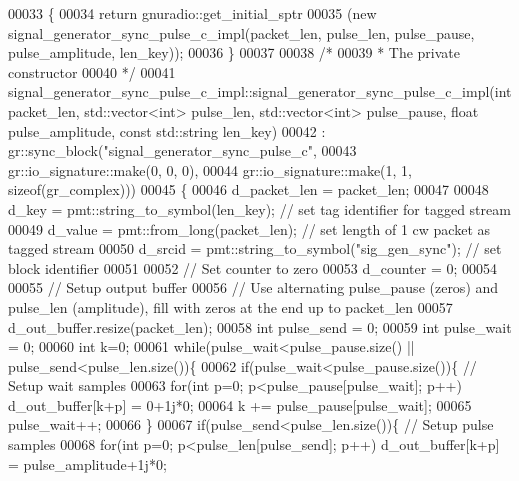 \begin{DoxyCode}
00033     \{
00034       \textcolor{keywordflow}{return} gnuradio::get\_initial\_sptr
00035         (\textcolor{keyword}{new} signal_generator_sync_pulse_c_impl(packet\_len, pulse\_len, pulse\_pause, pulse\_amplitude, 
      len\_key));
00036     \}
00037 
00038     \textcolor{comment}{/*}
00039 \textcolor{comment}{     * The private constructor}
00040 \textcolor{comment}{     */}
00041     signal_generator_sync_pulse_c_impl::signal_generator_sync_pulse_c_impl(\textcolor{keywordtype}{int} packet\_len, std::vector<int>
       pulse\_len, std::vector<int> pulse\_pause, \textcolor{keywordtype}{float} pulse\_amplitude, \textcolor{keyword}{const} 
      std::string len\_key)
00042       : gr::sync\_block(\textcolor{stringliteral}{"signal\_generator\_sync\_pulse\_c"},
00043               gr::io\_signature::make(0, 0, 0),
00044               gr::io\_signature::make(1, 1, sizeof(gr\_complex)))
00045     \{
00046         d_packet_len = packet\_len;
00047         
00048         d_key = pmt::string\_to\_symbol(len\_key); \textcolor{comment}{// set tag identifier for tagged stream}
00049         d_value = pmt::from\_long(packet\_len); \textcolor{comment}{// set length of 1 cw packet as tagged stream}
00050         d_srcid = pmt::string\_to\_symbol(\textcolor{stringliteral}{"sig\_gen\_sync"}); \textcolor{comment}{// set block identifier}
00051         
00052         \textcolor{comment}{// Set counter to zero}
00053         d_counter = 0;
00054         
00055         \textcolor{comment}{// Setup output buffer}
00056         \textcolor{comment}{// Use alternating pulse\_pause (zeros) and pulse\_len (amplitude), fill with zeros at the end up to
       packet\_len}
00057         d_out_buffer.resize(packet\_len);
00058         \textcolor{keywordtype}{int} pulse\_send = 0;
00059         \textcolor{keywordtype}{int} pulse\_wait = 0;
00060         \textcolor{keywordtype}{int} k=0;
00061         \textcolor{keywordflow}{while}(pulse\_wait<pulse\_pause.size() || pulse\_send<pulse\_len.size())\{
00062             \textcolor{keywordflow}{if}(pulse\_wait<pulse\_pause.size())\{ \textcolor{comment}{// Setup wait samples}
00063                 \textcolor{keywordflow}{for}(\textcolor{keywordtype}{int} p=0; p<pulse\_pause[pulse\_wait]; p++) d_out_buffer[k+p] = 0+1j*0;
00064                 k += pulse\_pause[pulse\_wait];
00065                 pulse\_wait++;
00066             \}
00067             \textcolor{keywordflow}{if}(pulse\_send<pulse\_len.size())\{ \textcolor{comment}{// Setup pulse samples}
00068                 \textcolor{keywordflow}{for}(\textcolor{keywordtype}{int} p=0; p<pulse\_len[pulse\_send]; p++) d_out_buffer[k+p] = pulse\_amplitude+1j*0;

\end{DoxyCode}
